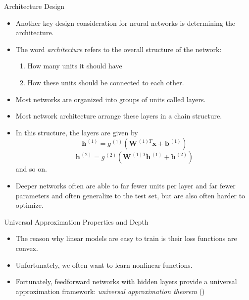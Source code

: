 \documentclass[10pt]{beamer}
\begin{document}
	\begin{frame}{Architecture Design}
		\begin{itemize}
			\item Another key design consideration for neural networks is determining the architecture.
			\pause
			\item The word \emph{architecture} refers to the overall structure of the network: 
			\begin{enumerate}
				\item How many units it should have
				\item How these units should be connected to each other.
			\end{enumerate}
			\pause
			\item Most networks are organized into groups of units called layers.
			\pause
			\item Most network architecture arrange these layers in a chain structure.
			\pause
			\item In this structure, the layers are given by
			$$\bm{h}^{\,(1)}=g^{\,(1)}(\bm{W}^{\,(1)T}\bm{x}+\bm{b}^{\,(1)})$$
			$$\bm{h}^{\,(2)}=g^{\,(2)}(\bm{W}^{\,(1)T}\bm{h}^{\,(1)}+\bm{b}^{\,(2)})$$ 
			and so on.
			\pause
			\item Deeper networks often are able to far fewer units per layer and far fewer parameters and often generalize to the test set, but are also often harder to optimize.
		\end{itemize}
	\end{frame}

	\begin{frame}{Universal Approximation Properties and Depth}
		\begin{itemize}
			\item The reason why linear models are easy to train is their loss functions are convex.
			\pause
			\item Unfortunately, we often want to learn nonlinear functions.
			\pause
			\item Fortunately, feedforward networks with hidden layers provide a universal approximation framework: \emph{universal approximation theorem} (\citet{hornik1989multilayer,cybenko1989approximation})
		\end{itemize}
	\end{frame}
\end{document}
